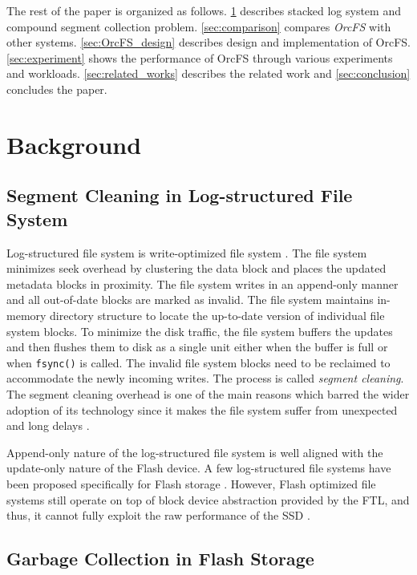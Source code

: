 \documentclass[prodmode,acmtecs]{acmsmall}
\begin{document}
The rest of the paper is organized as follows.  \cref{sec:background}
describes stacked log system and compound segment collection problem.
\cref{sec:comparison} compares \emph{OrcFS} with other systems.
\cref{sec:OrcFS_design} describes design and implementation of OrcFS.
\cref{sec:experiment} shows the performance of OrcFS through various
experiments and workloads.  \cref{sec:related_works} describes the
related work and \cref{sec:conclusion} concludes the paper.



\section{Background}
\label{sec:background}

\subsection{Segment Cleaning in Log-structured File System}

Log-structured file system is write-optimized file system
\cite{rosenblum1992design}. The file system minimizes seek overhead by
clustering the data block and places the updated metadata blocks in proximity.
The file system writes in an append-only manner and all out-of-date
blocks are marked as invalid. The file system maintains in-memory
directory structure to locate the up-to-date version of individual file
system blocks. To minimize the disk traffic, the file system buffers
the updates and then flushes them to disk as a single unit either when the
buffer is full or when \texttt{fsync()} is called.  The invalid file
system blocks need to be reclaimed to accommodate the newly incoming
writes. The process is called \emph{segment cleaning}. The segment
cleaning overhead is one of the main reasons which barred the wider
adoption of its technology since it makes the file system suffer from
unexpected and long delays \cite{seltzer1995file}.

Append-only nature of the log-structured file system is well aligned
with the update-only nature of the Flash device. A few log-structured
file systems have been proposed specifically for Flash storage
\cite{manning2010yaffs,woodhouse2001jffs,lee2015f2fs}.  However,
Flash optimized file systems still operate on top of block device
abstraction provided by the FTL, and thus, it cannot fully exploit the
raw performance of the SSD \cite{sdf}.


\subsection{Garbage Collection in Flash Storage}
\end{document}
